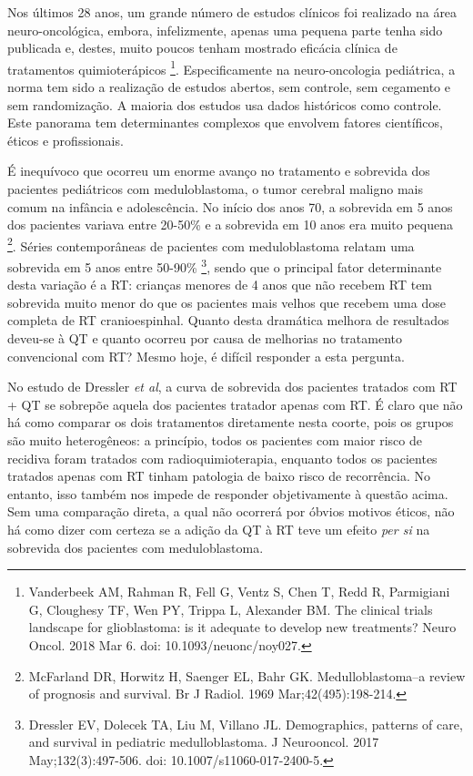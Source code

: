 \documentclass[11pt,a4paper,oldfontcommands]{memoir}
\begin{document}
Nos últimos 28 anos, um grande número de estudos clínicos foi realizado na área neuro-oncológica, embora, infelizmente, apenas uma pequena parte tenha sido publicada e, destes, muito poucos tenham mostrado eficácia clínica de tratamentos quimioterápicos \footnote{Vanderbeek AM, Rahman R, Fell G, Ventz S, Chen T, Redd R, Parmigiani G, Cloughesy TF, Wen PY, Trippa L, Alexander BM. The clinical trials landscape for glioblastoma: is it adequate to develop new treatments? Neuro Oncol. 2018 Mar 6. doi: 10.1093/neuonc/noy027.}. Especificamente na neuro-oncologia pediátrica, a norma tem sido a realização de estudos abertos, sem controle, sem cegamento e sem randomização. A maioria dos estudos usa dados históricos como controle. Este panorama tem determinantes complexos que envolvem fatores científicos, éticos e profissionais.

É inequívoco que ocorreu um enorme avanço no tratamento e sobrevida dos pacientes pediátricos com meduloblastoma, o tumor cerebral maligno mais comum na infância e adolescência. No início dos anos 70, a sobrevida em 5 anos dos pacientes variava entre 20-50\% e a sobrevida em 10 anos era muito pequena \footnote{McFarland DR, Horwitz H, Saenger EL, Bahr GK. Medulloblastoma--a review of prognosis and survival. Br J Radiol. 1969 Mar;42(495):198-214.}. Séries contemporâneas de pacientes com meduloblastoma relatam uma sobrevida em 5 anos entre 50-90\% \footnote{Dressler EV, Dolecek TA, Liu M, Villano JL. Demographics, patterns of care, and survival in pediatric medulloblastoma. J Neurooncol. 2017 May;132(3):497-506. doi: 10.1007/s11060-017-2400-5.}, sendo que o principal fator determinante desta variação é a RT: crianças menores de 4 anos que não recebem RT tem sobrevida muito menor do que os pacientes mais velhos que recebem uma dose completa de RT cranioespinhal. Quanto desta dramática melhora de resultados deveu-se à QT e quanto ocorreu por causa de melhorias no tratamento convencional com RT? Mesmo hoje, é difícil responder a esta pergunta. 

No estudo de Dressler \textit{et al}, a curva de sobrevida dos pacientes tratados com RT + QT se sobrepõe aquela dos pacientes tratador apenas com RT. É claro que não há como comparar os dois tratamentos diretamente nesta coorte, pois os grupos são muito heterogêneos: a princípio, todos os pacientes com maior risco de recidiva foram tratados com radioquimioterapia, enquanto todos os pacientes tratados apenas com RT tinham patologia de baixo risco de recorrência. No entanto, isso também nos impede de responder objetivamente à questão acima. Sem uma comparação direta, a qual não ocorrerá por óbvios motivos éticos, não há como dizer com certeza se a adição da QT à RT teve um efeito \textit{per si} na sobrevida dos pacientes com meduloblastoma.
\end{document}
